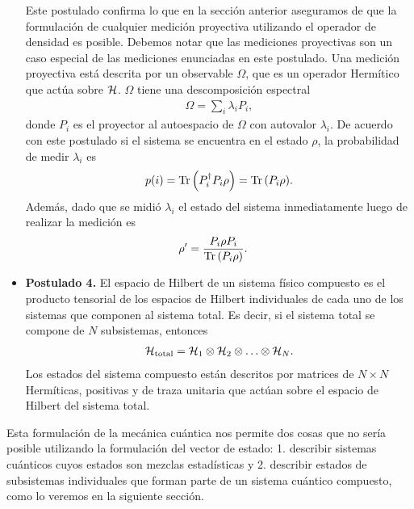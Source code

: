 \begin{itemize}
\begin{equation}
	\label{eq:postulate2_completeness}
	\end{equation}
	Este postulado confirma lo que en la sección anterior aseguramos
	de que la formulación de cualquier medición proyectiva utilizando el 
	operador de densidad es posible. Debemos notar que las mediciones
	proyectivas son un caso especial de las mediciones enunciadas en
	este postulado.
	Una medición proyectiva está descrita por un observable
	$\Omega$, que es un operador Hermítico que actúa sobre $\mathcal{H}$. 
	$\Omega$ tiene una descomposición espectral \cite{nielsen_chuang_2011}
	\begin{align}
		\Omega = \sum _i \lambda_iP_i,
	\end{align}
	donde $P_i$ es el proyector al autoespacio de $\Omega$ 
	con autovalor $\lambda_i$.
	De acuerdo con este postulado si el sistema se encuentra en el estado
	$\rho$, la probabilidad de medir $\lambda_i$ es
	\begin{align}
		p(i) = \Tr \qty(P_i^{\dagger}P_i\rho) = \Tr \qty(P_i\rho).
	\end{align}
	Además, dado que se midió $\lambda_i$ el estado del sistema inmediatamente 
	luego de realizar la medición es 
	\begin{align}
		\rho'&=\frac{P_i\rho P_i}{\Tr \qty(P_i \rho)}.
	\end{align}
	\item[] \textbf{Postulado 4.} El espacio de Hilbert de un sistema físico 
	compuesto es el producto tensorial de los espacios de Hilbert 
	individuales de cada uno de los sistemas que componen al sistema total.
	Es decir, si el sistema total se compone de $N$ subsistemas, entonces
	\begin{align}
		\mathcal{H}_{\text{total}} = \mathcal{H}_1\otimes \mathcal{H}_2 \otimes \ldots \otimes \mathcal{H}_N.
	\end{align}
	Los estados del sistema compuesto están descritos por matrices de 
$N\times N$ Hermíticas, positivas y de traza unitaria que actúan 
sobre el espacio de Hilbert del sistema total.
\end{itemize}

Esta formulación de la mecánica cuántica nos permite 
dos cosas que no sería posible utilizando la formulación del 
vector de estado:
1. describir sistemas cuánticos cuyos estados son mezclas estadísticas y
2. describir estados de subsistemas individuales que forman parte de 
un sistema cuántico compuesto, como lo veremos
en la siguiente sección. 

